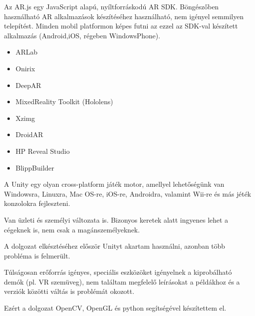 Az AR.js egy JavaScript alapú, nyíltforráskodú AR SDK. Böngészőben használható AR alkalmazások készítéséhez használható, nem igényel semmilyen telepítést. Minden mobil platformon képes futni az ezzel az SDK-val készített alkalmazás (Android,iOS, régeben WindowsPhone).


\begin{itemize}
\item ARLab
\item Onirix
\item DeepAR
\item MixedReality Toolkit (Hololens)
\item Xzimg
\item DroidAR
\item HP Reveal Studio
\item BlippBuilder \cite{arsdks}
\end{itemize}


A Unity egy  olyan cross-platform játék motor, amellyel lehetőségünk van Windowsra, Linuxra, Mac OS-re, iOS-re, Androidra, valamint Wii-re és más jéték konzolokra fejleszteni.

Van üzleti és személyi változata is. Bizonyos keretek alatt ingyenes lehet a cégeknek is, nem csak a magánszemélyeknek.

A dolgozat elkésztéséhez először Unityt akartam használni, azonban több probléma is felmerült. 

Túlságosan erőforrás igényes, speciális eszközöket igényelnek a kiprobálható demók (pl. VR szemüveg), nem találtam megfelelő leírásokat a példákhoz és a verziók közötti váltás is problémát okozott.

Ezért a dolgozat OpenCV, OpenGL és python segítségével készítettem el.
